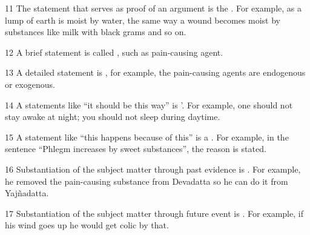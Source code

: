 \begin{translation}
    \item [11] The statement that serves as proof of an argument is the . For example, as a lump of earth is moist by water, the same way a wound becomes moist by substances like milk with black grams and so on.  
    
    \item [12] A brief statement is called , such as  {pain-causing agent}. 
    
    \item [13] A detailed statement is , for example, the pain-causing agents are endogenous or exogenous. 
    
    \item [14] A statements like ``it should be this way'' is '. For example, one should not stay awake at night; you should not sleep during daytime.  
    
    \item [15] A statement like “this happens because of this” is a . For example, in the sentence “Phlegm increases by sweet substances”, the reason is stated.  
    
    \item [16] Substantiation of the subject matter through past evidence is . For example, he removed the pain-causing substance from Devadatta so he can do it from Yajñadatta. 
    
    \item [17] Substantiation of the subject matter through future event is . For example, if his wind goes up he would get colic by that.  
    
    
    
\end{translation}

